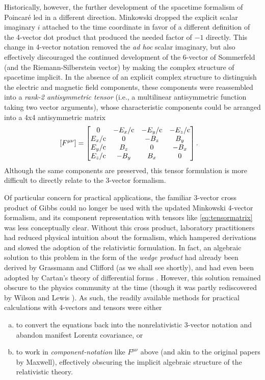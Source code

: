 \documentclass[1p,sort&compress]{elsarticle}
\numberwithin{equation}{section}
\newcommand{\cc}{{\rm c}}
\begin{document}
Historically, however, the further development of the spacetime formalism of Poincar\'e led in a different direction.  Minkowski \cite{Minkowski1908} dropped the explicit scalar imaginary $i$ attached to the time coordinate in favor of a different definition of the 4-vector dot product that produced the needed factor of $-1$ directly. This change in 4-vector notation removed the \emph{ad hoc} scalar imaginary, but also effectively discouraged the continued development of the 6-vector of Sommerfeld (and the Riemann-Silberstein vector) by making the complex structure of spacetime implicit.  In the absence of an explicit complex structure to distinguish the electric and magnetic field components, these components were reassembled into a \emph{rank-2 antisymmetric tensor} (i.e., a multilinear antisymmetric function taking two vector arguments), whose characteristic components could be arranged into a 4x4 antisymmetric matrix
\begin{align}\label{eq:tensormatrix}
  [F^{\mu\nu}] &= \begin{bmatrix}0 & -E_x/\cc & -E_y/\cc & -E_z/\cc \\ E_x/\cc & 0 & -B_z & B_y \\ E_y/\cc & B_z & 0 & -B_x \\ E_z/\cc & -B_y & B_x & 0\end{bmatrix}.
\end{align}
Although the same components are preserved, this tensor formulation is more difficult to directly relate to the 3-vector formalism.

Of particular concern for practical applications, the familiar 3-vector cross product of Gibbs could no longer be used with the updated Minkowski 4-vector formalism, and its component representation with tensors like \eqref{eq:tensormatrix} was less conceptually clear.  Without this cross product, laboratory practitioners had reduced physical intuition about the formalism, which hampered derivations and slowed the adoption of the relativistic formulation.  In fact, an algebraic solution to this problem in the form of the \emph{wedge product} had already been derived by Grassmann \cite{Grassmann1844} and Clifford \cite{Clifford1878} (as we shall see shortly), and had even been adopted by Cartan's theory of differential forms \cite{Cartan1899}.  However, this solution remained obscure to the physics community at the time (though it was partly rediscovered by Wilson and Lewis \cite{Wilson1911}).  As such, the readily available methods for practical calculations with 4-vectors and tensors were either 
\begin{enumerate}[(a)]
  \item to convert the equations back into the nonrelativistic 3-vector notation and abandon manifest Lorentz covariance, or 
  \item to work in \emph{component-notation} like $F^{\mu\nu}$ above (and akin to the original papers by Maxwell), effectively obscuring the implicit algebraic structure of the relativistic theory.
\end{enumerate}
\end{document}
